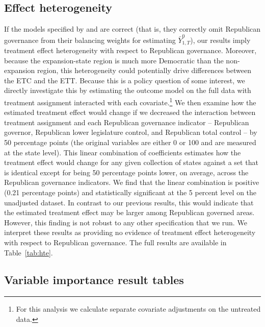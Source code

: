 \subsection{Effect heterogeneity}

If the models specified by \cite{kaestner2017effects} and \cite{courtemanche2017early} are correct (that is, they correctly omit Republican governance from their balancing weights for estimating $\bar{Y}^0_{1, T}$), our results imply treatment effect heterogeneity with respect to Republican governance. Moreover, because the expansion-state region is much more Democratic than the non-expansion region, this heterogeneity could potentially drive differences between the ETC and the ETT. Because this is a policy question of some interest, we directly investigate this by estimating the outcome model on the full data with treatment assignment interacted with each covariate.\footnote{For this analysis we calculate separate covariate adjustments on the untreated data.} We then examine how the estimated treatment effect would change if we decreased the interaction between treatment assignment and each Republican governance indicator -- Republican governor, Republican lower legislature control, and Republican total control -- by 50 percentage points (the original variables are either 0 or 100 and are measured at the state level). This linear combination of coefficients estimates how the treatment effect would change for any given collection of states against a set that is identical except for being 50 percentage points lower, on average, across the Republican governance indicators. We find that the linear combination is positive (0.21 percentage points) and statistically significant at the 5 percent level on the unadjusted dataset. In contrast to our previous results, this would indicate that the estimated treatment effect may be larger among Republican governed areas. However, this finding is not robust to any other specification that we run. We interpret these results as providing no evidence of treatment effect heterogeneity with respect to Republican governance. The full results are available in Table~\ref{tab:hte}.

\subsection{Variable importance result tables}

